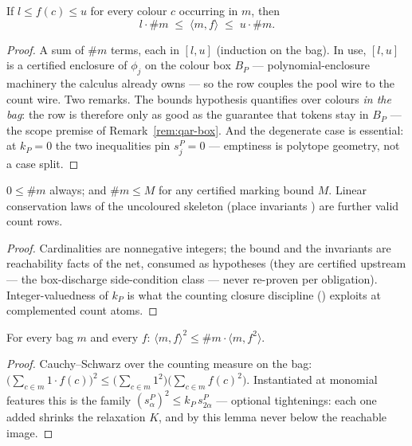 \begin{blemma}\label{lem:qar-couple}
If $l \leq f(c) \leq u$ for every colour $c$ occurring in $m$, then
\[
l \cdot \#m \;\leq\; \langle m, f \rangle \;\leq\; u \cdot \#m .
\]
\end{blemma}
\begin{proof}
A sum of $\#m$ terms, each in $[l, u]$ (induction on the bag). In use,
$[l, u]$ is a certified enclosure of $\phi_j$ on the colour box $B_P$
--- polynomial-enclosure machinery the calculus already owns --- so the
row couples the pool wire to the count wire. Two remarks. The bounds
hypothesis quantifies over colours \emph{in the bag}: the row is
therefore only as good as the guarantee that tokens stay in $B_P$ ---
the scope premise of Remark~\ref{rem:qar-box}. And the degenerate case
is essential: at $k_P = 0$ the two inequalities pin $s^P_j = 0$ ---
emptiness is polytope geometry, not a case split.
\end{proof}

\begin{blemma}\label{lem:qar-count}
$0 \leq \#m$ always; and $\#m \leq M$ for any certified marking bound
$M$. Linear conservation laws of the uncoloured skeleton (place
invariants \cite{murata1989}) are further valid count rows.
\end{blemma}
\begin{proof}
Cardinalities are nonnegative integers; the bound and the invariants
are reachability facts of the net, consumed as hypotheses (they are
certified upstream --- the box-discharge side-condition class ---
never re-proven per obligation). Integer-valuedness of $k_P$ is what
the counting closure discipline ()
exploits at complemented count atoms.
\end{proof}

\begin{blemma}\label{lem:qar-moment}
For every bag $m$ and every $f$:
$\langle m, f \rangle^2 \leq \#m \cdot \langle m, f^2 \rangle$.
\end{blemma}
\begin{proof}
Cauchy--Schwarz over the counting measure on the bag:
$\bigl(\sum_{c \in m} 1 \cdot f(c)\bigr)^2 \leq
\bigl(\sum_{c \in m} 1^2\bigr)\bigl(\sum_{c \in m} f(c)^2\bigr)$.
Instantiated at monomial features this is the family
$(s^P_\alpha)^2 \leq k_P\, s^P_{2\alpha}$ --- optional tightenings:
each one added shrinks the relaxation $K$, and by this lemma never
below the reachable image.
\end{proof}

